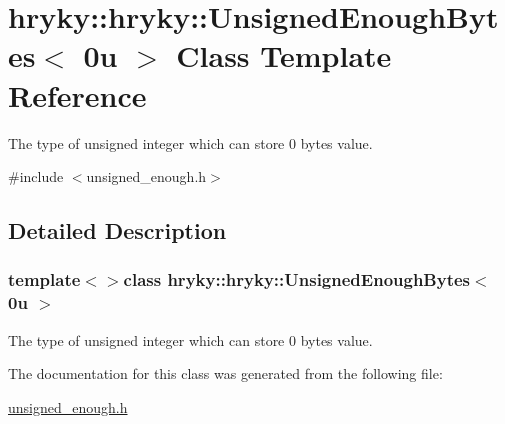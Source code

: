 \hypertarget{classhryky_1_1hryky_1_1_unsigned_enough_bytes_3_010u_01_4}{\section{hryky\-:\-:hryky\-:\-:Unsigned\-Enough\-Bytes$<$ 0u $>$ Class Template Reference}
\label{classhryky_1_1hryky_1_1_unsigned_enough_bytes_3_010u_01_4}
}


The type of unsigned integer which can store 0 bytes value.  




{\ttfamily \#include $<$unsigned\-\_\-enough.\-h$>$}



\subsection{Detailed Description}
\subsubsection*{template$<$$>$class hryky\-::hryky\-::\-Unsigned\-Enough\-Bytes$<$ 0u $>$}

The type of unsigned integer which can store 0 bytes value. 

The documentation for this class was generated from the following file\-:\begin{DoxyCompactItemize}
\item 
\hyperlink{unsigned__enough_8h}{unsigned\-\_\-enough.\-h}\end{DoxyCompactItemize}

